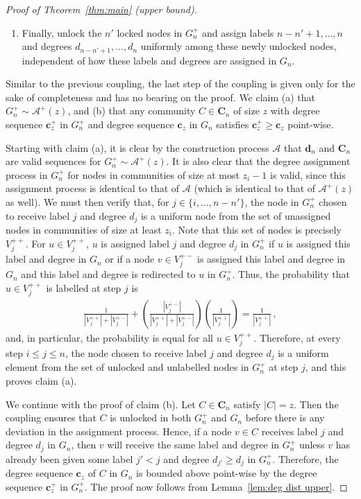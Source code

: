 \documentclass[12pt]{article}
\theoremstyle{definition}
\theoremstyle{remark}
\theoremstyle{remark}
\numberwithin{theorem}{section}
\newcommand{\abcdDist}{\ensuremath{\mathcal{A}}}
\newcommand{\abcdUpper}{\ensuremath{\mathcal{A}^+(z)}}
\begin{document}
\begin{proof}[Proof of Theorem~\ref{thm:main} (upper bound)]
\begin{enumerate}
\item Finally, unlock the $n'$ locked nodes in $G_n^+$ and assign labels $n-n'+1, \dots , n$ and degrees $d_{n-n'+1},\dots,d_n$ uniformly among these newly unlocked nodes, independent of how these labels and degrees are assigned in $G_n$. 
\end{enumerate}
Similar to the previous coupling, the last step of the coupling is given only for the sake of completeness and has no bearing on the proof. We claim (a) that $G_n^+ \sim \abcdUpper$, and (b) that any community $C \in \textbf{C}_n$ of size $z$ with degree sequence $\mathbf{c}_z^+$ in $G_n^+$ and degree sequence $\mathbf{c}_z$ in $G_n$ satisfies $\mathbf{c}_z^+ \geq \mathbf{c}_z$ point-wise.  

Starting with claim (a), it is clear by the construction process $\abcdDist$ that $\textbf{d}_n$ and $\textbf{C}_n$ are valid sequences for $G_n^+ \sim \abcdUpper$. It is also clear that the degree assignment process in $G_n^+$ for nodes in communities of size at most $z_i-1$ is valid, since this assignment process is identical to that of $\abcdDist$ (which is identical to that of $\abcdUpper$ as well). We must then verify that, for $j  \in \{ i,\dots,n-n' \}$, the node in $G_n^+$ chosen to receive label $j$ and degree $d_j$ is a uniform node from the set of unassigned nodes in communities of size at least $z_i$. Note that this set of nodes is precisely $V_j^{++}$. For $u \in V_j^{++}$, $u$ is assigned label $j$ and degree $d_j$ in $G_n^+$ if $u$ is assigned this label and degree in $G_n$ or if a node $v \in V_j^{+-}$ is assigned this label and degree in $G_n$ and this label and degree is redirected to $u$ in $G_n^+$. Thus, the probability that $u \in V_j^{++}$ is labelled at step $j$ is 
\begin{align*}
\frac{1}{|V_j^{++}| + |V_j^{+-}|} + \left(\frac{|V_j^{+-}|}{|V_j^{++}| + |V_j^{+-}|}\right) \left( \frac{1}{|V_j^{++}|} \right) = \frac{1}{|V_j^{++}|}\,,
\end{align*}
and, in particular, the probability is equal for all $u \in V_j^{++}$. 
Therefore, at every step $i \leq j \leq n$, the node chosen to receive label $j$ and degree $d_j$ is a uniform element from the set of unlocked and unlabelled nodes in $G_n^+$ at step $j$, and this proves claim (a).

We continue with the proof of claim (b). Let $C \in \textbf{C}_n$ satisfy $|C| = z$. Then the coupling ensures that $C$ is unlocked in both $G_n^+$ and $G_n$ before there is any deviation in the assignment process. Hence, if a node $v \in C$ receives label $j$ and degree $d_j$ in $G_n$, then $v$ will receive the same label and degree in $G_n^+$ unless $v$ has already been given some label $j' < j$ and degree $d_{j'} \geq d_j$ in $G_n^+$. Therefore, the degree sequence $\mathbf{c}_z$ of $C$ in $G_n$ is bounded above point-wise by the degree sequence $\mathbf{c}_z^+$ in $G_n^+$. The proof now follows from Lemma~\ref{lem:deg dist upper}. 
\end{proof}
\end{document}
